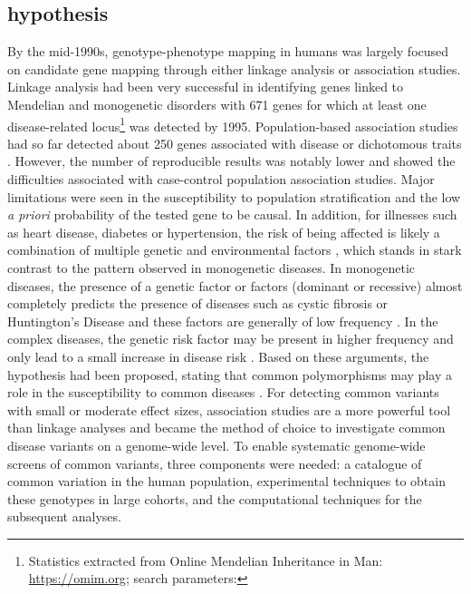 \subsection{ hypothesis}
By the mid-1990s, genotype-phenotype mapping in humans was largely focused on candidate gene mapping through either linkage analysis or association studies. Linkage analysis had been very successful in identifying genes linked to Mendelian and monogenetic disorders with \num{671} genes for which at least one disease-related locus\footnote{Statistics extracted from Online Mendelian Inheritance in Man: \url{https://omim.org}; search parameters: } was detected by 1995. Population-based association studies had so far detected about 250 genes associated with disease or dichotomous traits \citep{Hirschhorn2002}. However, the number of reproducible results was notably lower and showed the difficulties associated with case-control population association studies. Major limitations were seen in the susceptibility to population stratification \citep{Lohmueller2003} and the low \textit{a priori} probability of the tested gene to be causal. In addition, for illnesses such as heart disease, diabetes or hypertension, the risk of being affected is likely a combination of multiple genetic and environmental factors \citep{Hunter2005}, which stands in stark contrast to the pattern observed in monogenetic diseases. In monogenetic diseases, the presence of a genetic factor or factors (dominant or recessive) almost completely predicts the presence of diseases such as cystic fibrosis or Huntington's Disease and these factors are generally of low frequency \citep{Sankaranarayanan1998}.  In the complex diseases, the genetic risk factor may be present in higher frequency and only lead to a small increase in disease risk \citep{Reich2001}. Based on these arguments, the  hypothesis had been proposed, stating that common polymorphisms may play a role in the susceptibility to common diseases \citep{Risch1996,Lander1996,Chakravarti1999,Reich2001}. For detecting common variants with small or moderate effect sizes, association studies are a more powerful tool than linkage analyses \citep{Ott2015} and became the method of choice to investigate common disease variants on a genome-wide level. To enable systematic genome-wide screens of common variants, three components were needed: a catalogue of common variation in the human population, experimental techniques to obtain these genotypes in large cohorts, and the computational techniques for the subsequent analyses. 

